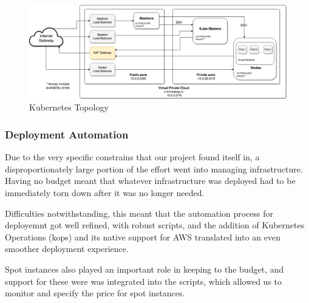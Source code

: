 \begin{figure}[htbp]
  \centering
  \hspace*{-0.825 in}
  \includegraphics[scale=0.4]{images/Infrastructure_topology.png}
  \caption{Kubernetes Topology}
  \label{Kuberenetes-topo}
\end{figure}


\subsubsection{Deployment Automation}\label{deployment-automation}

Due to the very specific constrains that our project found itself in, a
disproportionately large portion of the effort went into managing
infrastructure. Having no budget meant that whatever infrastructure was
deployed had to be immediately torn down after it was no longer needed.

Difficulties notwithstanding, this meant that the automation process for
deployemnt got well refined, with robust scripts, and the addition of
Kubernetes Operations (kops) and its native support for AWS translated
into an even smoother deployment experience.

Spot instances also played an important role in keeping to the budget,
and support for these were was integrated into the scripts, which
allowed us to monitor and specify the price for spot instances.
